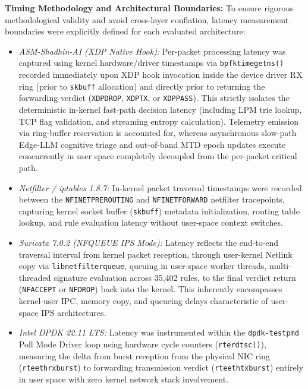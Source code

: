 \documentclass[journal]{IEEEtran}
\renewcommand{\_}{\textunderscore\allowbreak}
\begin{document}
\textbf{Timing Methodology and Architectural Boundaries:}
To ensure rigorous methodological validity and avoid cross-layer conflation, latency measurement boundaries were explicitly defined for each evaluated architecture:
\begin{itemize}
  \item \textit{ASM-Shadhin-AI (XDP Native Hook):} Per-packet processing latency was captured using kernel hardware/driver timestamps via \texttt{bpf\_ktime\_get\_ns()} recorded immediately upon XDP hook invocation inside the device driver RX ring (prior to \texttt{sk\_buff} allocation) and directly prior to returning the forwarding verdict (\texttt{XDP\_DROP}, \texttt{XDP\_TX}, or \texttt{XDP\_PASS}). This strictly isolates the deterministic in-kernel fast-path decision latency (including LPM trie lookup, TCP flag validation, and streaming entropy calculation). Telemetry emission via ring-buffer reservation is accounted for, whereas asynchronous slow-path Edge-LLM cognitive triage and out-of-band MTD epoch updates execute concurrently in user space completely decoupled from the per-packet critical path.
  \item \textit{Netfilter / iptables 1.8.7:} In-kernel packet traversal timestamps were recorded between the \texttt{NF\_INET\_PRE\_ROUTING} and \texttt{NF\_INET\_FORWARD} netfilter tracepoints, capturing kernel socket buffer (\texttt{sk\_buff}) metadata initialization, routing table lookup, and rule evaluation latency without user-space context switches.
  \item \textit{Suricata 7.0.2 (NFQUEUE IPS Mode):} Latency reflects the end-to-end traversal interval from kernel packet reception, through user-kernel Netlink copy via \texttt{libnetfilter\_queue}, queuing in user-space worker threads, multi-threaded signature evaluation across 35,402 rules, to the final verdict return (\texttt{NF\_ACCEPT} or \texttt{NF\_DROP}) back into the kernel. This inherently encompasses kernel-user IPC, memory copy, and queueing delays characteristic of user-space IPS architectures.
  \item \textit{Intel DPDK 22.11 LTS:} Latency was instrumented within the \texttt{dpdk-testpmd} Poll Mode Driver loop using hardware cycle counters (\texttt{rte\_rdtsc()}), measuring the delta from burst reception from the physical NIC ring (\texttt{rte\_eth\_rx\_burst}) to forwarding transmission verdict (\texttt{rte\_eth\_tx\_burst}) entirely in user space with zero kernel network stack involvement.
\end{itemize}
\end{document}
